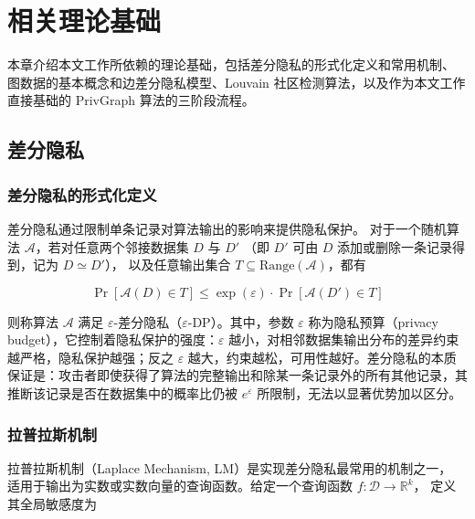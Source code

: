 \clearpage

\section{相关理论基础}

\par 本章介绍本文工作所依赖的理论基础，包括差分隐私的形式化定义和常用机制、
图数据的基本概念和边差分隐私模型、Louvain 社区检测算法，以及作为本文工作直接基础的 PrivGraph 
算法的三阶段流程。

\subsection{差分隐私}

\subsubsection{差分隐私的形式化定义}

\par 差分隐私通过限制单条记录对算法输出的影响来提供隐私保护。
对于一个随机算法 $\mathcal{A}$，若对任意两个邻接数据集 $D$ 与 $D'$
（即 $D'$ 可由 $D$ 添加或删除一条记录得到，记为 $D \simeq D'$），
以及任意输出集合 $T \subseteq \mathrm{Range}(\mathcal{A})$，都有

\begin{equation}
    \label{equ:dp-def}
    \Pr[\mathcal{A}(D) \in T] \leq \exp(\varepsilon) \cdot \Pr[\mathcal{A}(D') \in T]
\end{equation}

\par 则称算法 $\mathcal{A}$ 满足 $\varepsilon$-差分隐私（$\varepsilon$-DP）。其中，参数 $\varepsilon$ 称为隐私预算（privacy budget），它控制着隐私保护的强度：$\varepsilon$ 越小，对相邻数据集输出分布的差异约束越严格，隐私保护越强；反之 $\varepsilon$ 越大，约束越松，可用性越好。差分隐私的本质保证是：攻击者即使获得了算法的完整输出和除某一条记录外的所有其他记录，其推断该记录是否在数据集中的概率比仍被 $e^{\varepsilon}$ 所限制，无法以显著优势加以区分。

\subsubsection{拉普拉斯机制}

\par 拉普拉斯机制（Laplace Mechanism, LM）是实现差分隐私最常用的机制之一，
适用于输出为实数或实数向量的查询函数。给定一个查询函数 $f : \mathcal{D} \to \mathbb{R}^k$，
定义其全局敏感度为

